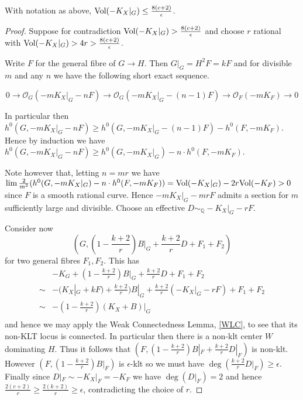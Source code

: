 \begin{lemma}\cite[Lemma 6.5]{jiang2014boundedness}
	With notation as above, $\text{Vol}(-K_{X}|_{G}) \leq \frac{8(c+2)}{\epsilon}$. 
\end{lemma}
\begin{proof}
	Suppose for contradiction $\text{Vol}(-K_{X}|_{G}) >\frac{8(c+2)}{\epsilon}$ and choose $r$ rational with $\text{Vol}(-K_{X}|_{G}) > 4r >\frac{8(c+2)}{\epsilon}$.
	
	Write $F$ for the general fibre of $G \to H$. Then $G|_{G}=H^{2}F=kF$ and for divisible $m$ and any $n$ we have the following short exact sequence.
	
	\[0 \to \mathcal{O}_{G}(-mK_{X}|_{G}-nF) \to \mathcal{O}_{G}(-mK_{X}|_{G}-(n-1)F) \to \mathcal{O}_{F}(-mK_{F}) \to 0\]
	
	In particular then $h^{0}(G,-mK_{X}|_{G}-nF) \geq h^{0}(G,-mK_{X}|_{G}-(n-1)F)-h^{0}(F,-mK_{F})$.
	Hence by induction we have $h^{0}(G,-mK_{X}|_{G}-nF) \geq h^{0}(G,-mK_{X}|_{G})-n\cdot h^{0}(F,-mK_{F})$.
	
	Note however that, letting $n=mr$ we have $\lim \frac{2}{m^{2}}(h^{0}(G,-mK_{X}|_{G})-n\cdot h^{0}(F,-mK_{F}))= \text{Vol}(-K_{X}|_{G})-2r\text{Vol}(-K_{F}) > 0$ since $F$ is a smooth rational curve. Hence $-mK_{X}|_{G}-mrF$ admits a section for $m$ sufficiently large and divisible. Choose an effective $D\sim_{\mathbb{Q}} -K_{X}|_{G}-rF$.
	
	Consider now \[(G,(1-\frac{k+2}{r})B|_{G}+\frac{k+2}{r}D+F_{1}+F_{2})\]
	 for two general fibres $F_{1}, F_{2}$.
	This has \begin{align*}
	&-K_{G}+(1-\frac{k+2}{r})B|_{G}+\frac{k+2}{r}D+F_{1}+F_{2}	\\
	\sim & -(K_{X}|_{G}+kF)+\frac{k+2}{r})B|_{G}+\frac{k+2}{r}(-K_{X}|_{G}-rF)+F_{1}+F_{2} \\	
	\sim & -(1-\frac{k+2}{r})(K_{X}+B)|_{G} \\
	\end{align*}
	and hence we may apply the Weak Connectedness Lemma, \autoref{WLC}, to see that its non-KLT locus is connected. In particular then there is a non-klt center $W$ dominating $H$. Thus it follows that $(F,(1-\frac{k+2}{r})B|_{F}+\frac{k+2}{r}D|_{F})$ is non-klt. However $(F,(1-\frac{k+2}{r})B|_{F})$ is $\epsilon$-klt so we must have $\deg (\frac{k+2}{r}D|_{F})\geq \epsilon$. Finally since $D|_{F}\sim -K_{X}|_{F}=-K_{F}$ we have $\deg(D|_{F})=2$ and hence $\frac{2(c+2)}{r} \geq \frac{2(k+2)}{r} \geq \epsilon$, contradicting the choice of $r$.
\end{proof}

